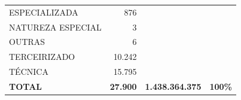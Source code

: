 \documentclass{article}
\begin{document}
\begin{longtable}[c]{m{7cm}|m{2.5cm}|m{2.5cm}|m{2.5cm}}
\multicolumn{1}{L{7cm}|}{ \hspace{3em} ESPECIALIZADA} & \multicolumn{1}{r|}{    876} &  & \\
\multicolumn{1}{L{7cm}|}{ \hspace{3em} NATUREZA ESPECIAL} & \multicolumn{1}{r|}{      3} &  & \\
\multicolumn{1}{L{7cm}|}{ \hspace{3em} OUTRAS} & \multicolumn{1}{r|}{      6} &  & \\
\multicolumn{1}{L{7cm}|}{ \hspace{3em} TERCEIRIZADO} & \multicolumn{1}{r|}{ 10.242} &  & \\
\multicolumn{1}{L{7cm}|}{ \hspace{3em} TÉCNICA} & \multicolumn{1}{r|}{ 15.795} &  & \\
\hline \hline 
\multicolumn{1}{L{7cm}|}{ \textbf{TOTAL}} & \multicolumn{1}{r|}{ \textbf{27.900}} & \multicolumn{1}{r|}{ \textbf{1.438.364.375}} & \multicolumn{1}{r}{ \textbf{100\%}} \\
\end{longtable}
\newpage
\small
\end{document}
